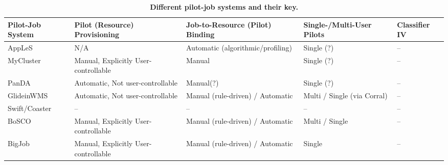 \documentclass{sig-alternate}
\begin{document}


\begin{table}[t]
 \up
 \centering
 \begin{tabular}{|p{3cm}|p{3.2cm}|p{3cm}|p{3cm}|p{3cm}|}
  \hline
  \textbf{Pilot-Job System} &\textbf{Pilot (Resource) Provisioning}    &\textbf{Job-to-Resource (Pilot) Binding}  &\textbf{Single-/Multi-User Pilots} &\textbf{Classifier IV}  \\
  \hline
          AppLeS            & N/A                                      & Automatic (algorithmic/profiling)  & Single (?) & --                     \\
  \hline
          MyCluster         & Manual, Explicitly User-controllable     & Manual                             & Single (?)                  & --                     \\
  \hline
          PanDA             & Automatic, Not user-controllable         & Manual(?)                          & Single (?)      & --                     \\
  \hline
          GlideinWMS        & Automatic, Not user-controllable         & Manual (rule-driven) / Automatic   & Multi / Single (via Corral) & --                     \\
  \hline
          Swift/Coaster     & --                                       & --                                 & --                          & --                     \\
 \hline
          BoSCO             & Manual, Explicitly User-controllable     & Manual (rule-driven) / Automatic   & Multi / Single              & --                     \\
 \hline
          BigJob             & Manual, Explicitly User-controllable     & Manual (rule-driven) / Automatic   & Single              & --                     \\
 \hline
 \end{tabular}
 \caption{\textbf{Different pilot-job systems and their key.
 }
 \up}
 \label{table:implementations-comparison}
\end{table}

   
\end{document}
